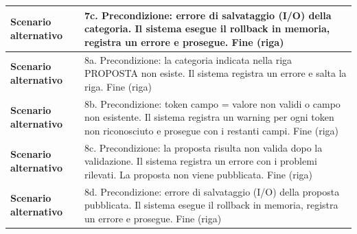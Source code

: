 \documentclass[12pt, a4paper, oneside]{report}
\begin{document}
\begin{tabularx}{\textwidth}{|l|X|}
    \textbf{Scenario alternativo} & 
    7c. Precondizione: errore di salvataggio (I/O) della categoria.\newline
    Il sistema esegue il rollback in memoria, registra un errore e prosegue.\newline
    Fine (riga) \\ \hline

    \textbf{Scenario alternativo} & 
    8a. Precondizione: la categoria indicata nella riga PROPOSTA non esiste.\newline
    Il sistema registra un errore e salta la riga.\newline
    Fine (riga) \\ \hline

    \textbf{Scenario alternativo} & 
    8b. Precondizione: token campo = valore non validi o campo non esistente.\newline
    Il sistema registra un warning per ogni token non riconosciuto e prosegue con i restanti campi.\newline
    Fine (riga) \\ \hline

    \textbf{Scenario alternativo} & 
    8c. Precondizione: la proposta risulta non valida dopo la validazione.\newline
    Il sistema registra un errore con i problemi rilevati. La proposta non viene pubblicata.\newline
    Fine (riga) \\ \hline

    \textbf{Scenario alternativo} & 
    8d. Precondizione: errore di salvataggio (I/O) della proposta pubblicata.\newline
    Il sistema esegue il rollback in memoria, registra un errore e prosegue.\newline
    Fine (riga) \\ \hline
\end{tabularx}

\renewcommand{\arraystretch}{1.4} 
\end{document}

